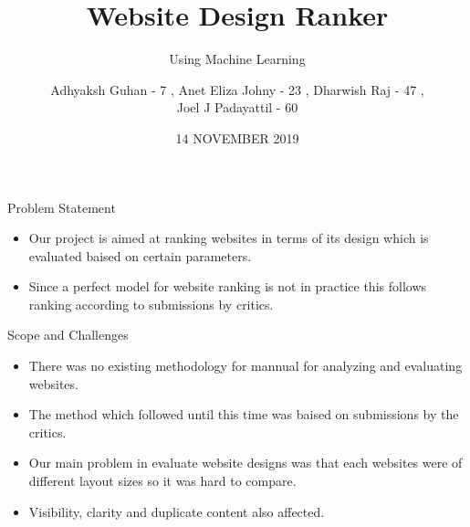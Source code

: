 \documentclass[11pt]{beamer}
\begin{document}
	\title{\textbf{Website Design Ranker}}
	\subtitle{Using Machine Learning}
	\date{14 NOVEMBER 2019}
	\author{{\scriptsize Adhyaksh Guhan - 7 , Anet Eliza Johny - 23 , Dharwish Raj - 47 , \\ Joel J Padayattil - 60}}
	\begin{frame}[plain]
		\maketitle
	\end{frame}
	\begin{frame}{Problem Statement}
		\begin{itemize}
			
			
			\item Our project is aimed at ranking websites in terms of its design which is evaluated baised on certain parameters.
			
			\item Since a perfect model for website ranking  is not in practice this  follows ranking according to submissions by critics.
			
		\end{itemize}
	\end{frame}
	\begin{frame}{Scope and Challenges}
		\begin{itemize}
			
			\item There was no existing methodology for mannual for analyzing and evaluating websites.
			
			\item The method which followed until this time was baised on submissions by the critics.
			
			\item Our main problem in evaluate website designs was that each websites were of different layout sizes so it was hard to compare.
			
			\item Visibility, clarity and duplicate content also affected.
			
	
			
		\end{itemize}
	\end{frame}
\end{document}
